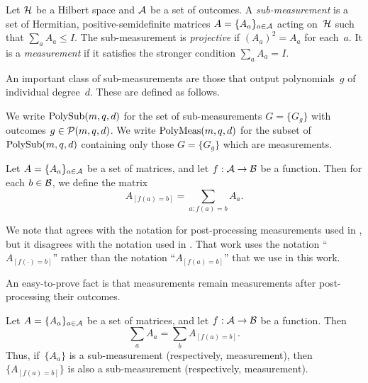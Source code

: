 \begin{definition}
Let $\mathcal{H}$ be a Hilbert space and $\mathcal{A}$ be a set of outcomes.
A \emph{sub-measurement}
is a set of Hermitian, positive-semidefinite matrices
$A = \{A_a\}_{a \in \mathcal{A}}$
acting on~$\mathcal{H}$
such that $\sum_a A_a \leq I$.
The sub-measurement is \emph{projective} if $(A_a)^2 = A_a$ for each~$a$.
It is a \emph{measurement}
if it satisfies the stronger condition $\sum_a A_a = I$.
\end{definition}

An important class of sub-measurements
are those that output polynomials~$g$ of individual degree~$d$.
These are defined as follows.

\begin{definition}
We write $\mathrm{PolySub}(m, q, d)$ for the set of sub-measurements $G=\{G_g\}$
with outcomes $g \in \mathcal{P}(m, q, d)$.
We write $\mathrm{PolyMeas}(m, q, d)$ for the subset of $\mathrm{PolySub}(m, q, d)$
containing only those $G = \{G_g\}$ which are measurements.
\end{definition}

\begin{definition}\label{def:post-processing}
Let $A = \{A_a\}_{a \in \mathcal{A}}$ be a set of matrices,
and let $f:\mathcal{A} \rightarrow \mathcal{B}$ be a function.
Then for each $b \in \mathcal{B}$,
we define the matrix
\begin{equation*}
A_{[f(a)=b]} = \sum_{a:f(a)=b} A_a.
\end{equation*}
\end{definition}

\begin{remark}
We note that 
agrees with the notation for post-processing measurements
used in \cite{NW19},
but it disagrees with the notation used in \cite{JNV+20}.
That work uses the notation ``$A_{[f(\cdot)=b]}$'' rather
than the notation ``$A_{[f(a)=b]}$'' that we use in this work. 
\end{remark}

An easy-to-prove fact is that measurements remain measurements after post-processing their outcomes.

\begin{proposition}
Let $A = \{A_a\}_{a \in \mathcal{A}}$ be a set of matrices,
and let $f:\mathcal{A} \rightarrow \mathcal{B}$ be a function.
Then
\begin{equation*}
\sum_a A_a = \sum_b A_{[f(a)=b]}.
\end{equation*}
Thus, if~$\{A_a\}$ is a sub-measurement (respectively, measurement),
then~$\{A_{[f(a)=b]}\}$ is also a sub-measurement (respectively, measurement).
\end{proposition}

